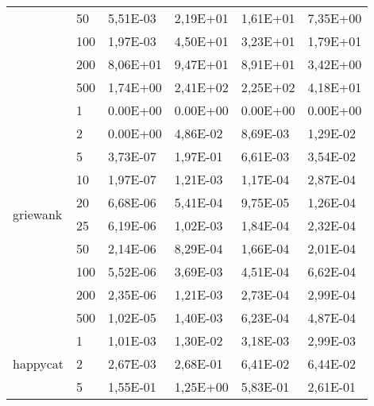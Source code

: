 \begin{longtable}[c]{|m{3.5cm}|l|l|l|l|l|}
                                        & 50        & 5,51E-03   & 2,19E+01   & 1,61E+01   & 7,35E+00  \\ \cline{2-6} 
                                        & 100       & 1,97E-03   & 4,50E+01   & 3,23E+01   & 1,79E+01  \\ \cline{2-6} 
                                        & 200       & 8,06E+01   & 9,47E+01   & 8,91E+01   & 3,42E+00  \\ \cline{2-6} 
                                        & 500       & 1,74E+00   & 2,41E+02   & 2,25E+02   & 4,18E+01  \\ \hline
\multirow{10}{*}{griewank}              & 1         & 0.00E+00   & 0.00E+00   & 0.00E+00   & 0.00E+00  \\ \cline{2-6} 
                                        & 2         & 0.00E+00   & 4,86E-02   & 8,69E-03   & 1,29E-02  \\ \cline{2-6} 
                                        & 5         & 3,73E-07   & 1,97E-01   & 6,61E-03   & 3,54E-02  \\ \cline{2-6} 
                                        & 10        & 1,97E-07   & 1,21E-03   & 1,17E-04   & 2,87E-04  \\ \cline{2-6} 
                                        & 20        & 6,68E-06   & 5,41E-04   & 9,75E-05   & 1,26E-04  \\ \cline{2-6} 
                                        & 25        & 6,19E-06   & 1,02E-03   & 1,84E-04   & 2,32E-04  \\ \cline{2-6} 
                                        & 50        & 2,14E-06   & 8,29E-04   & 1,66E-04   & 2,01E-04  \\ \cline{2-6} 
                                        & 100       & 5,52E-06   & 3,69E-03   & 4,51E-04   & 6,62E-04  \\ \cline{2-6} 
                                        & 200       & 2,35E-06   & 1,21E-03   & 2,73E-04   & 2,99E-04  \\ \cline{2-6} 
                                        & 500       & 1,02E-05   & 1,40E-03   & 6,23E-04   & 4,87E-04  \\ \hline
\multirow{10}{*}{happycat}              & 1         & 1,01E-03   & 1,30E-02   & 3,18E-03   & 2,99E-03  \\ \cline{2-6} 
                                        & 2         & 2,67E-03   & 2,68E-01   & 6,41E-02   & 6,44E-02  \\ \cline{2-6} 
                                        & 5         & 1,55E-01   & 1,25E+00   & 5,83E-01   & 2,61E-01  \\ \cline{2-6} 

\end{longtable}
